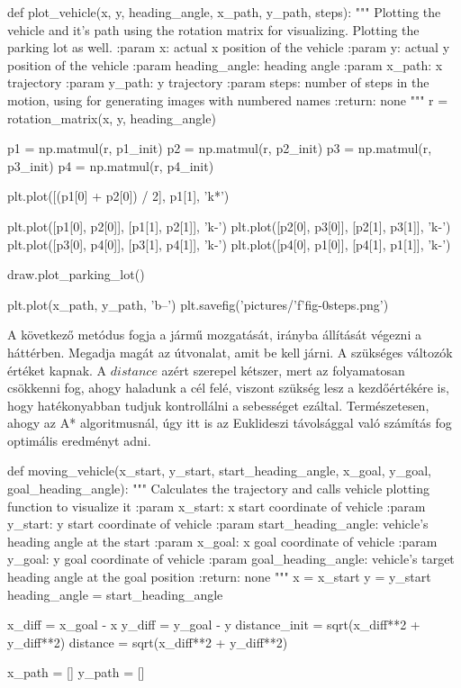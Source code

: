 \begin{python}
def plot_vehicle(x, y, heading_angle, x_path, y_path, steps):
    """
    Plotting the vehicle and it's path using the rotation matrix
    for visualizing.
    Plotting the parking lot as well.
    :param x: actual x position of the vehicle
    :param y: actual y position of the vehicle
    :param heading_angle: heading angle
    :param x_path: x trajectory
    :param y_path: y trajectory
    :param steps: number of steps in the motion, using for generating
    images with numbered names
    :return: none
    """
    r = rotation_matrix(x, y, heading_angle)

    p1 = np.matmul(r, p1_init)
    p2 = np.matmul(r, p2_init)
    p3 = np.matmul(r, p3_init)
    p4 = np.matmul(r, p4_init)

    plt.plot([(p1[0] + p2[0]) / 2], p1[1], 'k*')

    plt.plot([p1[0], p2[0]], [p1[1], p2[1]], 'k-')
    plt.plot([p2[0], p3[0]], [p2[1], p3[1]], 'k-')
    plt.plot([p3[0], p4[0]], [p3[1], p4[1]], 'k-')
    plt.plot([p4[0], p1[0]], [p4[1], p1[1]], 'k-')

    draw.plot_parking_lot()

    plt.plot(x_path, y_path, 'b--')
    plt.savefig('pictures/'f'fig-0{steps}.png')

\end{python}

\bigskip

A következő metódus fogja a jármű mozgatását, irányba állítását végezni a háttérben. Megadja magát az útvonalat, amit be kell járni. A szükséges változók értéket kapnak. A $ distance $ azért szerepel kétszer, mert az folyamatosan csökkenni fog, ahogy haladunk a cél felé, viszont szükség lesz a kezdőértékére is, hogy hatékonyabban tudjuk kontrollálni a sebességet ezáltal. Természetesen, ahogy az A* algoritmusnál, úgy itt is az Euklideszi távolsággal való számítás fog optimális eredményt adni.

\begin{python}
def moving_vehicle(x_start, y_start, start_heading_angle, x_goal,
 y_goal, goal_heading_angle):
    """
    Calculates the trajectory and calls vehicle plotting
    function to visualize it
    :param x_start: x start coordinate of vehicle
    :param y_start: y start coordinate of vehicle
    :param start_heading_angle: vehicle's heading angle at the start
    :param x_goal: x goal coordinate of vehicle
    :param y_goal: y goal coordinate of vehicle
    :param goal_heading_angle: vehicle's target heading angle
    at the goal position
    :return: none
    """
    x = x_start
    y = y_start
    heading_angle = start_heading_angle

    x_diff = x_goal - x
    y_diff = y_goal - y
    distance_init = sqrt(x_diff**2 + y_diff**2)
    distance = sqrt(x_diff**2 + y_diff**2)

    x_path = []
    y_path = []
\end{python}

